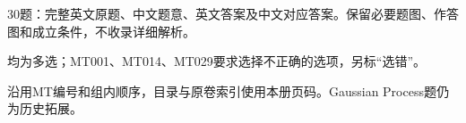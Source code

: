 
30题：完整英文原题、中文题意、英文答案及中文对应答案。保留必要题图、作答图和成立条件，不收录详细解析。


均为多选；MT001、MT014、MT029要求选择不正确的选项，另标“选错”。


沿用MT编号和组内顺序，目录与原卷索引使用本册页码。Gaussian Process题仍为历史拓展。
